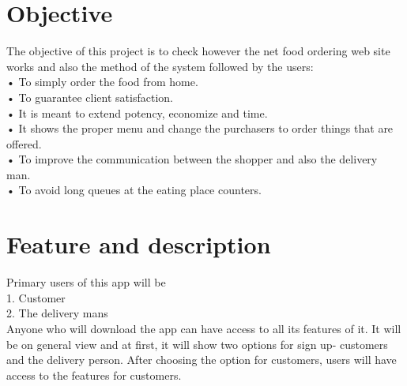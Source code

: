 \documentclass[letterpaper]{report}
\begin{document}
\section{Objective}
The objective of this project is to check however the net food ordering web site works and also the method of the system followed by the users:\\[0.4cm]
• To simply order the food from home.\\
• To guarantee client satisfaction.\\
• It is meant to extend potency, economize and time.\\
• It shows the proper menu and change the purchasers to order things that are offered.\\
• To improve the communication between the shopper and also the delivery man.\\
• To avoid long queues at the eating place counters.
\newpage
\section{Feature and description}
Primary users of this app will be \\
1.      Customer\\
2.      The delivery mans\\[0.2cm]
Anyone who will download the app can have access to all its features of it. It will be on general view and at first, it will show two options for sign up- customers and the delivery person. After choosing the option for customers, users will have access to the features for customers.\\
\end{document}
